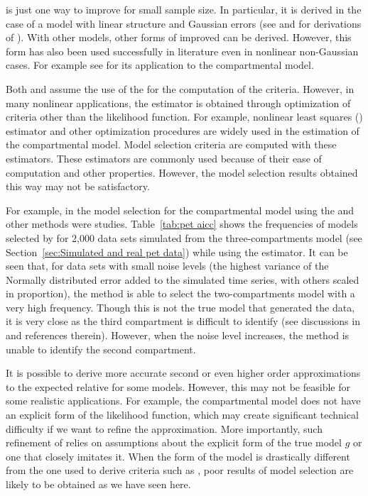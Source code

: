 \aicc is just one way to improve \aic for small sample size. In particular, it is derived in the case of a model with linear structure and Gaussian errors (see \cite{Hurvich:1989ev} and \cite[][sec.~6.4.1]{Burnham:2002wc} for derivations of \aicc). With other models, other forms of improved \aic can be derived. However, this form has also been used successfully in literature even in nonlinear non-Gaussian cases. For example see \cite{Turkheimer:2003iy} for its application to the \pet compartmental model.

Both \aic and \aicc assume the use of the \mle for the computation of the criteria. However, in many nonlinear applications, the estimator is obtained through optimization of criteria other than the likelihood function. For example, nonlinear least squares (\nls) estimator and other optimization procedures are widely used in the estimation of the \pet compartmental model. Model selection criteria are computed with these estimators. These estimators are commonly used because of their ease of computation and other properties. However, the model selection results obtained this way may not be satisfactory.

For example, in \cite{Zhou2013} the model selection for the \pet compartmental model using the \aic and other methods were studies. Table~\ref{tab:pet aicc} shows the frequencies of models selected by \aicc for 2,000 data sets simulated from the three-compartments model (see Section~\ref{sec:Simulated and real pet data}) while using the \nls estimator. It can be seen that, for data sets with small noise levels (the highest variance of the Normally distributed error added to the simulated time series, with others scaled in proportion), the \aicc method is able to select the two-compartments model with a very high frequency. Though this is not the true model that generated the data, it is very close as the third compartment is difficult to identify (see discussions in \cite{Zhou2013} and references therein). However, when the noise level increases, the method is unable to identify the second compartment.



It is possible to derive more accurate second or even higher order approximations to the expected relative \kld for some models. However, this may not be feasible for some realistic applications. For example, the \pet compartmental model does not have an explicit form of the likelihood function, which may create significant technical difficulty if we want to refine the \aic approximation. More importantly, such refinement of \aic relies on assumptions about the explicit form of the true model $g$ or one that closely imitates it. When the form of the model is drastically different from the one used to derive criteria such as \aicc, poor results of model selection are likely to be obtained as we have seen here.

